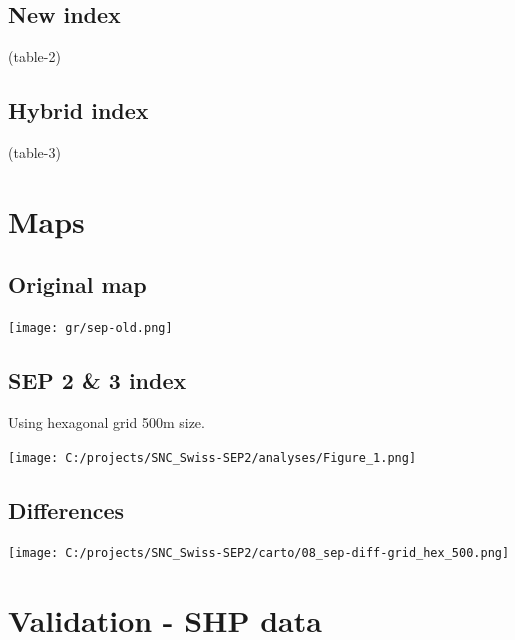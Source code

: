 \documentclass[a4paper, notitlepage, fleqn]{article} %
\begin{document}
\newpage
\subsection{New index}
\begin{landscape}
\begin{footnotesize}
(table-2)
\end{footnotesize}
\end{landscape}

\newpage
\subsection{Hybrid index}
\begin{landscape}
\begin{footnotesize}
(table-3)
\end{footnotesize}
\end{landscape}

\newpage
\section{Maps}
\subsection{Original map}
\begin{center}
\texttt{[image: gr/sep-old.png]} 
\end{center}
\newpage 
\subsection{SEP 2 \& 3 index}

Using hexagonal grid 500m size.  
\begin{center}
\texttt{[image: C:/projects/SNC\_Swiss-SEP2/analyses/Figure\_1.png]} 
\end{center}
\newpage
\subsection{Differences}
\begin{center}
\texttt{[image: C:/projects/SNC\_Swiss-SEP2/carto/08\_sep-diff-grid\_hex\_500.png]} 
\end{center}
\newpage
\section{Validation - SHP data}
\end{document}
